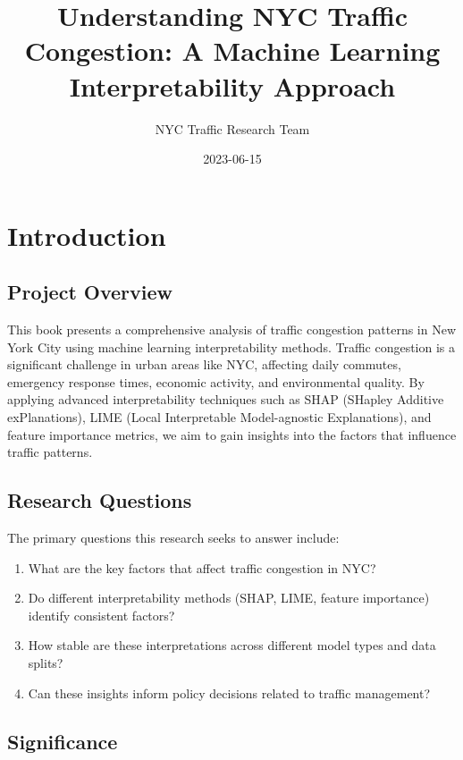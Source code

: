 \documentclass[
  letterpaper,
  DIV=11,
  numbers=noendperiod]{scrreprt}
\title{Understanding NYC Traffic Congestion: A Machine Learning
Interpretability Approach}
\author{NYC Traffic Research Team}
\date{2023-06-15}
\providecommand{\tightlist}{%
  \setlength{\itemsep}{0pt}\setlength{\parskip}{0pt}}\usepackage{longtable,booktabs,array}
\renewcommand*\contentsname{Table of contents}
\newcommand\contentsname{Table of contents}
\begin{document}
\maketitle

\renewcommand*\contentsname{Table of contents}
{
\hypersetup{linkcolor=}
\setcounter{tocdepth}{2}
\tableofcontents
}

\chapter{Introduction}\label{introduction}

\section{Project Overview}\label{project-overview}

This book presents a comprehensive analysis of traffic congestion
patterns in New York City using machine learning interpretability
methods. Traffic congestion is a significant challenge in urban areas
like NYC, affecting daily commutes, emergency response times, economic
activity, and environmental quality. By applying advanced
interpretability techniques such as SHAP (SHapley Additive
exPlanations), LIME (Local Interpretable Model-agnostic Explanations),
and feature importance metrics, we aim to gain insights into the factors
that influence traffic patterns.

\section{Research Questions}\label{research-questions}

The primary questions this research seeks to answer include:

\begin{enumerate}
\def\labelenumi{\arabic{enumi}.}
\tightlist
\item
  What are the key factors that affect traffic congestion in NYC?
\item
  Do different interpretability methods (SHAP, LIME, feature importance)
  identify consistent factors?
\item
  How stable are these interpretations across different model types and
  data splits?
\item
  Can these insights inform policy decisions related to traffic
  management?
\end{enumerate}

\section{Significance}\label{significance}
\end{document}
